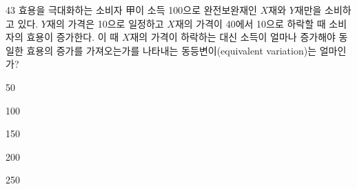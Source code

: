\begin{question}{43}
효용을 극대화하는 소비자 甲이 소득 100으로 완전보완재인 $X$재와 $Y$재만을 소비하고 있다. $Y$재의 가격은 10으로 일정하고 $X$재의 가격이 40에서 10으로 하락할 때 소비자의 효용이 증가한다. 이 때 $X$재의 가격이 하락하는 대신 소득이 얼마나 증가해야 동일한 효용의 증가를 가져오는가를 나타내는 동등변이(equivalent variation)는 얼마인가?
\begin{choices}
  \item 50
  \item 100
  \item 150
  \item 200
  \item 250
\end{choices}
\end{question}
\answerall
{}
